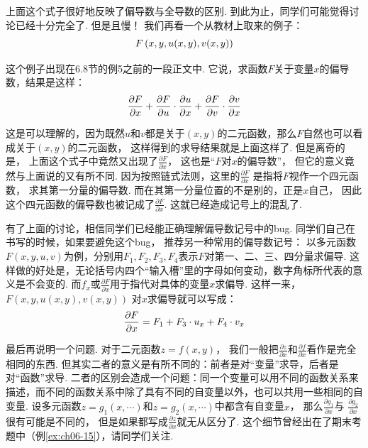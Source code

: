 上面这个式子很好地反映了偏导数与全导数的区别.
到此为止，同学们可能觉得讨论已经十分完全了.
但是且慢！
我们再看一个从教材上取来的例子：
$$
\setlength\abovedisplayskip{6pt}
    \setlength\belowdisplayskip{6pt}
F\left(x,y,u(x,y),v(x,y)\right)
$$\par
这个例子出现在6.8节的例5之前的一段正文中.
它说，求函数$F$关于变量$x$的偏导数，结果是这样：
$$
\setlength\abovedisplayskip{6pt}
    \setlength\belowdisplayskip{6pt}
\frac{\partial F}{\partial x} +
\frac{\partial F}{\partial u} \cdot \frac{\partial u}{\partial x}
+\frac{\partial F}{\partial v} \cdot \frac{\partial v}{\partial x}
$$\par
这是可以理解的，因为既然$u$和$v$都是关于$(x,y)$的二元函数，那么$F$自然也可以看成关于$(x,y)$的二元函数，
这样得到的求导结果就是上面这样了.
但是离奇的是，
上面这个式子中竟然又出现了$\frac{\partial F}{\partial x}$，
这也是“$F$对$x$的偏导数”，
但它的意义竟然与上面说的又有所不同.
因为按照链式法则，这里的$\frac{\partial F}{\partial x}$
是指将$F$视作一个四元函数，
求其第一分量的偏导数.
而在其第一分量位置的不是别的，正是$x$自己，
因此这个四元函数的偏导数也被记成了$\frac{\partial F}{\partial x}$.
这就已经造成记号上的混乱了.

有了上面的讨论，相信同学们已经能正确理解偏导数记号中的bug.
同学们自己在书写的时候，如果要避免这个bug，
推荐另一种常用的偏导数记号：
以多元函数$F(x,y,u,v)$为例，分别用$F_1,F_2,F_3,F_4$表示$F$对第一、二、三、四分量求偏导.
这样做的好处是，无论括号内四个“输入槽”里的字母如何变动，数字角标所代表的意义是不会变的.
而$f_x$或$\frac{\partial F}{\partial x}$用于指代对具体的变量$x$求偏导.
这样一来，$F\left(x,y,u(x,y),v(x,y)\right)$
对$x$求偏导就可以写成：
$$
\setlength\abovedisplayskip{6pt}
    \setlength\belowdisplayskip{6pt}
\frac{\partial F}{\partial x} =
F_1 + F_3 \cdot u_x + F_4 \cdot v_x
$$\par
最后再说明一个问题.
对于二元函数$z = f(x,y)$，
我们一般把$\frac{\partial z}{\partial x}$和$\frac{\partial f}{\partial x}$看作是完全相同的东西.
但其实二者的意义是有所不同的：前者是对“变量”求导，后者是对“函数”求导.
二者的区别会造成一个问题：同一个变量可以用不同的函数关系来描述，而不同的函数关系中除了具有不同的自变量以外，也可以共用一些相同的自变量.
设多元函数$z = g_1(x,\cdots)$和$z = g_2(x,\cdots)$中都含有自变量$x$，
那么$\frac{\partial g_1}{\partial x}$与
$\frac{\partial g_2}{\partial x}$很有可能是不同的，
但是如果都写成$\frac{\partial z}{\partial x}$就无从区分了.
这个细节曾经出在了期末考题中（例\ref{ex:ch06-15}），请同学们关注.

